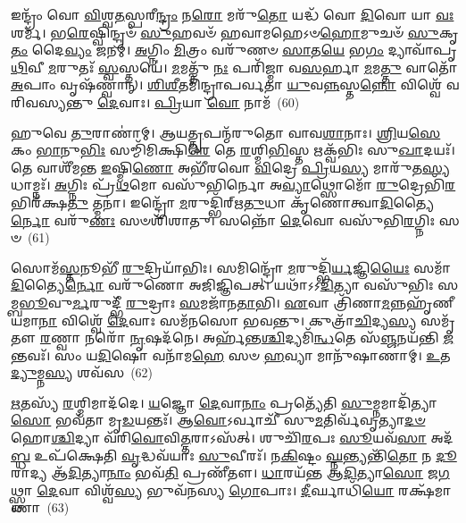 𑌇𑌨𑍍𑌦𑍍𑌰𑌂᳴ 𑌵𑍋 \ul{𑌵𑌿}\-𑌶𑍍𑌵\-\ul{𑌤}\-𑌸𑍍𑌪𑌰𑍀\-\ul{𑌨𑍍𑌦𑍍𑌰𑌂} 𑌨\-\ul{𑌰𑍋} 𑌮𑌰𑍁᳴\-\ul{𑌤𑍋} 𑌯𑌦𑍍𑌧᳴ 𑌵𑍋 \ul{𑌦𑌿}\-𑌵𑍋 𑌯𑌾 \ul{𑌵𑌃} 𑌶𑌰𑍍𑌮᳴। 𑌭\-\ul{𑌰𑍇}\-𑌷𑍍𑌵𑌿𑌨𑍍𑌦𑍍𑌰𑍞᳴ \ul{𑌸𑍁}\-𑌹𑌵𑍞᳴ 𑌹𑌵𑌾𑌮𑌹𑍇\-𑌽𑍞\-\ul{𑌹𑍋}\-𑌮𑍁𑌚𑍞᳴ \ul{𑌸𑍁}\-𑌕𑍃\-\ul{𑌤𑌂} 𑌦𑍈\-\ul{𑌵𑍍𑌯𑌂} 𑌜𑌨𑌮𑍍॑। \ul{𑌅}\-𑌗𑍍𑌨𑌿𑌂 \ul{𑌮𑌿}\-𑌤𑍍𑌰𑌂 𑌵𑌰𑍁᳴𑌣𑍞 \ul{𑌸𑌾}\-𑌤\-\ul{𑌯𑍇} 𑌭\-\ul{𑌗𑌂} 𑌦𑍍𑌯𑌾𑌵𑌾᳴𑌪𑍃\-\ul{𑌥𑌿}\-𑌵𑍀 \ul{𑌮}\-𑌰𑍁𑌤𑌃᳴ \ul{𑌸𑍍𑌵}\-𑌸𑍍𑌤𑌯𑍇॑। \ul{𑌮}\-𑌮𑌤𑍍𑌤𑍁᳴ \ul{𑌨𑌃} 𑌪𑌰𑌿᳴𑌜𑍍𑌮𑌾 𑌵\-\ul{𑌸}\-𑌰𑍍\mbox{}𑌹𑌾 \ul{𑌮}\-𑌮\-\ul{𑌤𑍍𑌤𑍁} 𑌵𑌾𑌤𑍋᳴ \ul{𑌅}\-𑌪𑌾𑌂 𑌵𑍃𑌷᳴𑌣𑍍𑌵𑌾𑌨𑍍। \ul{𑌶𑌿}\-\-\ul{𑌶𑍀}\-𑌤𑌮𑌿᳴𑌨𑍍𑌦𑍍𑌰𑌾𑌪𑌰𑍍𑌵𑌤𑌾 \ul{𑌯𑍁}\-𑌵\-\ul{𑌨𑍍𑌨}\-𑌸𑍍𑌤\-\ul{𑌨𑍍𑌨𑍋} 𑌵𑌿𑌶𑍍𑌵𑍇᳴ 𑌵𑌰𑌿𑌵𑌸𑍍𑌯𑌨𑍍𑌤𑍁 \ul{𑌦𑍇}\-𑌵𑌾𑌃। \ul{𑌪𑍍𑌰𑌿}\-𑌯𑌾 \ul{𑌵𑍋} 𑌨𑌾𑌮᳴~(60)

𑌹𑍁𑌵𑍇 \ul{𑌤𑍁}\-𑌰𑌾𑌣𑌾॑𑌮𑍍। 𑌆𑌯\-\ul{𑌤𑍍𑌤𑍃}\-𑌪𑌨𑍍𑌮᳴𑌰𑍁𑌤𑍋 𑌵𑌾𑌵\-\ul{𑌶𑌾}\-𑌨𑌾𑌃। \ul{𑌶𑍍𑌰𑌿}\-𑌯\-\ul{𑌸𑍇} 𑌕𑌂 \ul{𑌭𑌾}\-𑌨𑍁\-\ul{𑌭𑌿𑌃} 𑌸𑌮𑍍𑌮𑌿᳴𑌮𑌿𑌕𑍍𑌷𑌿\-\ul{𑌰𑍇} 𑌤𑍇 \ul{𑌰}\-𑌶𑍍𑌮𑌿\-\ul{𑌭𑌿}\-𑌸𑍍𑌤 𑌋𑌕𑍍𑌵᳴𑌭𑌿𑌃 𑌸𑍁\-\ul{𑌖𑌾}\-𑌦𑌯𑌃᳴। 𑌤𑍇 𑌵𑌾𑌶𑍀᳴𑌮𑌨𑍍𑌤 \ul{𑌇}\-𑌷𑍍𑌮𑌿\-\ul{𑌣𑍋} 𑌅𑌭𑍀᳴𑌰𑌵𑍋 \ul{𑌵𑌿}\-𑌦𑍍𑌰𑍇 \ul{𑌪𑍍𑌰𑌿}\-𑌯\-\ul{𑌸𑍍𑌯} 𑌮𑌾𑌰𑍁᳴𑌤\-\ul{𑌸𑍍𑌯} 𑌧𑌾𑌮𑍍𑌨𑌃᳴। \ul{𑌅}\-𑌗𑍍𑌨𑌿𑌃 𑌪𑍍𑌰᳴\-\ul{𑌥}\-𑌮𑍋 𑌵𑌸𑍁᳴𑌭𑌿𑌰𑍍𑌨𑍋 𑌅\-\ul{𑌵𑍍𑌯𑌾}\-𑌥𑍍𑌸𑍋𑌮𑍋᳴ \ul{𑌰𑍁}\-𑌦𑍍𑌰𑍇𑌭𑌿᳴\-\ul{𑌰}\-𑌭𑌿𑌰᳴𑌕𑍍𑌷\-\ul{𑌤𑍁} 𑌤𑍍𑌮𑌨𑌾॑। 𑌇𑌨𑍍𑌦𑍍𑌰𑍋᳴ \ul{𑌮}\-𑌰𑍁𑌦𑍍𑌭𑌿᳴𑌰𑍍\mbox{}𑌋\-\ul{𑌤𑍁}\-𑌧𑌾 𑌕𑍃᳴𑌣𑍋𑌤𑍍𑌵𑌾\-\ul{𑌦𑌿}\-𑌤𑍍𑌯𑍈\-\ul{𑌰𑍍𑌨𑍋} 𑌵𑌰𑍁᳴\-\ul{𑌣𑌃} 𑌸𑍞𑌶𑌿᳴𑌶𑌾𑌤𑍁। 𑌸𑌨𑍍𑌨𑍋᳴ \ul{𑌦𑍇}\-𑌵𑍋 𑌵𑌸𑍁᳴𑌭𑌿\-\ul{𑌰}\-𑌗𑍍𑌨𑌿𑌃 𑌸𑍞~(61)

𑌸𑍋𑌮᳴\-\ul{𑌸𑍍𑌤}\-𑌨𑍂𑌭𑍀᳴ \ul{𑌰𑍁}\-𑌦𑍍𑌰𑌿𑌯𑌾᳴𑌭𑌿𑌃। 𑌸𑌮𑌿𑌨𑍍𑌦𑍍𑌰𑍋᳴ \ul{𑌮}\-𑌰𑍁𑌦𑍍𑌭𑌿᳴\-\ul{𑌰𑍍𑌯}\-𑌜𑍍𑌞𑌿\-\ul{𑌯𑍈𑌃} 𑌸𑌮𑌾᳴\-\ul{𑌦𑌿}\-𑌤𑍍𑌯𑍈\-\ul{𑌰𑍍𑌨𑍋} 𑌵𑌰𑍁᳴𑌣𑍋 𑌅𑌜𑌿𑌜𑍍𑌞𑌿𑌪𑌤𑍍। 𑌯𑌥𑌾᳴\-𑌽\-𑌽\-\ul{𑌦𑌿}\-𑌤𑍍𑌯𑌾 𑌵𑌸𑍁᳴𑌭𑌿𑌃 𑌸𑌮𑍍𑌬\-\ul{𑌭𑍂}\-𑌵𑍁\-\ul{𑌰𑍍𑌮}\-𑌰𑍁𑌦𑍍𑌭𑍀᳴ \ul{𑌰𑍁}\-𑌦𑍍𑌰𑌾𑌃 \ul{𑌸}\-𑌮𑌜𑌾᳴𑌨\-\ul{𑌤𑌾}\-𑌭𑌿। \ul{𑌏}\-𑌵𑌾 𑌤𑍍𑌰𑌿᳴𑌣𑌾\-\ul{𑌮}\-𑌨𑍍𑌨𑌹𑍃᳴𑌣𑍀𑌯𑌮𑌾\-\ul{𑌨𑌾} 𑌵𑌿𑌶𑍍𑌵𑍇᳴ \ul{𑌦𑍇}\-𑌵𑌾𑌃 𑌸𑌮᳴𑌨𑌸𑍋 𑌭𑌵𑌨𑍍𑌤𑍁। 𑌕𑍁𑌤𑍍𑌰𑌾᳴\-\ul{𑌚𑌿}\-𑌦𑍍𑌯\-\ul{𑌸𑍍𑌯} 𑌸𑌮𑍃᳴𑌤𑍗 \ul{𑌰}\-𑌣𑍍𑌵𑌾 𑌨𑌰𑍋᳴ \ul{𑌨𑍃}\-𑌷𑌦᳴𑌨𑍇। 𑌅𑌰𑍍\mbox{}𑌹᳴𑌨𑍍𑌤\-\ul{𑌶𑍍𑌚𑌿}\-𑌦𑍍𑌯𑌮𑌿᳴\-\ul{𑌨𑍍𑌧}\-𑌤𑍇 𑌸᳴\-\ul{𑌞𑍍𑌜}\-𑌨𑌯᳴𑌨𑍍𑌤𑌿 \ul{𑌜}\-𑌨𑍍𑌤𑌵𑌃᳴। 𑌸𑌂 𑌯\-\ul{𑌦𑌿}\-𑌷𑍋 𑌵𑌨𑌾᳴𑌮\-\ul{𑌹𑍇} 𑌸𑍞 \ul{𑌹}\-𑌵𑍍𑌯𑌾 𑌮𑌾𑌨𑍁᳴𑌷𑌾𑌣𑌾𑌮𑍍। \ul{𑌉}\-𑌤 \ul{𑌦𑍍𑌯𑍁}\-𑌮𑍍𑌨\-\ul{𑌸𑍍𑌯} 𑌶𑌵᳴𑌸~(62)

\-\ul{𑌋}\-𑌤𑌸𑍍𑌯᳴ \ul{𑌰}\-𑌶𑍍𑌮𑌿𑌮𑌾𑌦᳴𑌦𑍇। \ul{𑌯}\-𑌜𑍍𑌞𑍋 \ul{𑌦𑍇}\-𑌵𑌾\-\ul{𑌨𑌾𑌂} 𑌪𑍍𑌰𑌤𑍍𑌯𑍇᳴𑌤𑌿 \ul{𑌸𑍁}\-𑌮𑍍𑌨𑌮𑌾𑌦𑌿᳴𑌤𑍍𑌯𑌾\-\ul{𑌸𑍋} 𑌭𑌵᳴𑌤𑌾 𑌮𑍃\-\ul{𑌡}\-𑌯𑌨𑍍𑌤𑌃᳴। 𑌆\-\ul{𑌵𑍋}\-\-𑌽𑌰𑍍𑌵𑌾𑌚𑍀᳴ 𑌸𑍁\-\ul{𑌮}\-𑌤𑌿𑌰𑍍𑌵᳴𑌵𑍃𑌤𑍍𑌯𑌾\-\-\ul{𑌦}\-\-\ul{𑍞}\-𑌹𑍋\-\ul{𑌶𑍍𑌚𑌿}\-𑌦𑍍𑌯𑌾 𑌵᳴𑌰𑌿\-\ul{𑌵𑍋}\-𑌵𑌿\-\ul{𑌤𑍍𑌤}\-𑌰𑌾\-𑌽𑌸᳴𑌤𑍍। 𑌶𑍁𑌚𑌿᳴\-\ul{𑌰}\-𑌪𑌃 \ul{𑌸𑍂}\-𑌯𑌵᳴\-\ul{𑌸𑌾} 𑌅𑌦᳴\-\ul{𑌬𑍍𑌧} 𑌉𑌪᳴𑌕𑍍𑌷𑍇𑌤𑌿 \ul{𑌵𑍃}\-𑌦𑍍𑌧𑌵᳴𑌯𑌾𑌃 \ul{𑌸𑍁}\-𑌵𑍀𑌰𑌃᳴। 𑌨\-\ul{𑌕𑌿}\-𑌷𑍍𑌟𑌂 \ul{𑌘𑍍𑌨}\-𑌨𑍍𑌤𑍍𑌯𑌨𑍍𑌤𑌿᳴\-\ul{𑌤𑍋} 𑌨 \ul{𑌦𑍂}\-𑌰𑌾𑌦𑍍𑌯 𑌆᳴\-\ul{𑌦𑌿}\-𑌤𑍍𑌯𑌾\-\ul{𑌨𑌾𑌂} 𑌭𑌵᳴\-\ul{𑌤𑌿} 𑌪𑍍𑌰𑌣𑍀᳴𑌤𑍗। \ul{𑌧𑌾}\-𑌰𑌯᳴𑌨𑍍𑌤 𑌆\-\ul{𑌦𑌿}\-𑌤𑍍𑌯𑌾\-\ul{𑌸𑍋} 𑌜\-\ul{𑌗}\-𑌥𑍍𑌸𑍍𑌥𑌾 \ul{𑌦𑍇}\-𑌵𑌾 𑌵𑌿𑌶𑍍𑌵᳴\-\ul{𑌸𑍍𑌯} 𑌭𑍁𑌵᳴𑌨𑌸𑍍𑌯 \ul{𑌗𑍋}\-𑌪𑌾𑌃। \ul{𑌦𑍀}\-𑌰𑍍𑌘𑌾𑌧𑌿᳴\-\ul{𑌯𑍋} 𑌰𑌕𑍍𑌷᳴𑌮𑌾𑌣𑌾~(63)

